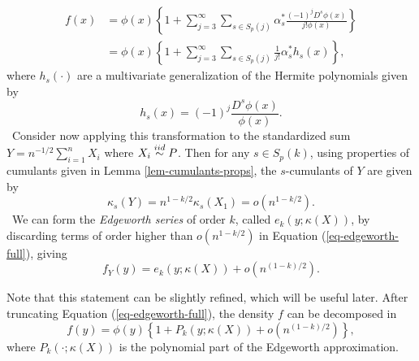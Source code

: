 \begin{align}
    f(x) 
    &= \phi(x) \left\{ 1 + \sum_{j=3}^\infty 
    \sum_{s \in S_p(j)}
    \alpha^*_s \frac{(-1)^j D^s \phi(x)}{j! \phi(x)}\right\} \nonumber \\
    &= \phi(x) \left\{
        1 + \sum_{j=3}^\infty  \sum_{s \in S_p(j)} \frac{1}{j!}\alpha^*_s h_s(x)
    \right\}, \label{eq-edgeworth-full}
\end{align} 
where $h_s(\cdot)$ are a multivariate generalization of the Hermite polynomials given by
\begin{equation*}
    h_s(x) = (-1)^j \frac{D^s \phi(x)}{\phi(x)}.
\end{equation*}
\
Consider now applying this transformation to the standardized sum $Y = n^{-1/2}\sum_{i=1}^n X_i$ where $X_i \stackrel{iid}{\sim} P$. Then for any $s \in S_p(k)$, using properties of cumulants given in Lemma \ref{lem-cumulants-props}, the $s$-cumulants of $Y$ are given by 
\begin{equation*}
    \kappa_s(Y) = n^{1-k/2} \kappa_s(X_1) = o(n^{1-k/2}).
\end{equation*}
\
We can form the \textit{Edgeworth series} of order $k$, called $e_k(y; \kappa(X))$, by discarding terms of order higher than $o(n^{1-k/2})$ in Equation (\ref{eq-edgeworth-full}), giving
\begin{equation} \label{eq-edgeworth}
    f_Y(y) = e_k(y; \kappa(X)) + o(n^{(1-k)/2}).
\end{equation}

Note that this statement can be slightly refined, which will be useful later. After truncating Equation (\ref{eq-edgeworth-full}), the density $f$ can be decomposed in
\begin{equation} \label{eq-edge-polynomial}
    f(y) = \phi(y)\left\{1 + P_k(y; \kappa(X)) + o(n^{(1-k)/2})\right\},
\end{equation}
where $P_k(\cdot; \kappa(X))$ is the polynomial part of the Edgeworth approximation.

